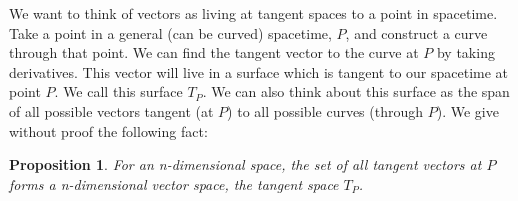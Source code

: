 \documentclass[11pt]{article}
\theoremstyle{plain}
\newtheorem{proposition}[theorem]{Proposition}
\begin{document}
We want to think of vectors as living at tangent spaces to a point in spacetime. Take a point in a general (can be curved) spacetime, $P$, and construct a curve through that point. We can find the tangent vector to the curve at $P$ by taking derivatives. This vector will live in a surface which is tangent to our spacetime at point $P$. We call this surface $T_{P}$. We can also think about this surface as the span of all possible vectors tangent (at $P$) to all possible curves (through $P$). We give without proof the following fact:

\begin{proposition}
For an n-dimensional space, the set of all tangent vectors at $P$ forms a n-dimensional vector space, the tangent space $T_{P}$.
\end{proposition}
\end{document}
